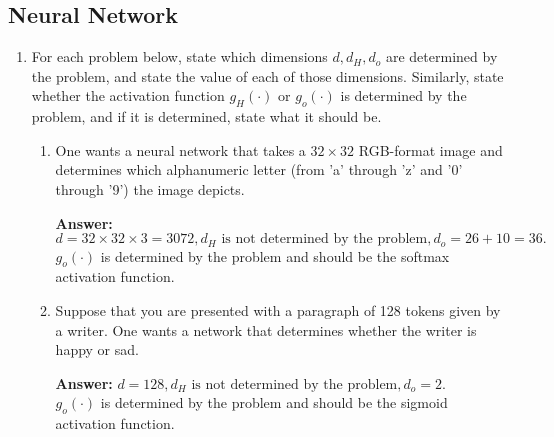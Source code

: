 \documentclass{assignment}
\date{April 4, 2024}
\begin{document}
\begin{problem}


\section{Neural Network}

\begin{enumerate}

    \item For each problem below, state which dimensions $d, d_H, d_o$ are determined by the problem, and state the value of each of those dimensions. Similarly, state whether the activation function $g_H(\cdot)$ or $g_o(\cdot)$ is determined by the problem, and if it is determined, state what it should be.
    
    \begin{enumerate}[label=(\alph*)]

    
        \item One wants a neural network that takes a $32 \times 32$ RGB-format image and determines which alphanumeric letter (from 'a' through 'z' and '0' through '9') the image depicts.

        \color{blue}\textbf{Answer:} 
            $d = 32 \times 32 \times 3 = 3072, d_H \text{ is not determined by the problem}, d_o = 26 + 10 = 36.$\\
            $g_o(\cdot)$ is determined by the problem and should be the softmax activation function.
        \color{black}


        
        \item Suppose that you are presented with a paragraph of 128 tokens given by a writer. One wants a network that determines whether the writer is happy or sad.

        \color{blue}\textbf{Answer:} 
            $d = 128, d_H \text{ is not determined by the problem}, d_o = 2.$\\
            $g_o(\cdot)$ is determined by the problem and should be the sigmoid activation function.
        \color{black}


\end{enumerate}
\end{enumerate}
\end{problem}
\end{document}
